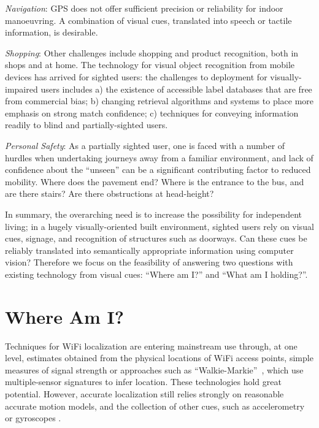 \emph{Navigation}: GPS does not offer sufficient precision or reliability for indoor manoeuvring. A combination of visual cues, translated into speech or tactile information, is desirable.

\emph{Shopping}: Other challenges include shopping and product recognition, both in shops and at home. The technology for visual object recognition from mobile devices has arrived for sighted users: the challenges to deployment for visually-impaired users includes a) the existence of accessible label databases that are free from commercial bias; b) changing retrieval algorithms and systems to place more emphasis on strong match confidence; c) techniques for conveying information readily to blind and partially-sighted users.

\emph{Personal Safety}: As a partially sighted user, one is faced with a number of hurdles when undertaking journeys away from a familiar environment, and lack of confidence about the ``unseen'' can be a significant contributing factor to reduced mobility.  Where does the pavement end?  Where is the entrance to the bus, and are there stairs?  Are there obstructions at head-height?   

In summary, the overarching need is to increase the possibility for independent living; in a hugely visually-oriented built environment, sighted users rely on visual cues, signage, and recognition of structures such as doorways.  Can these cues be reliably translated into semantically appropriate information using computer vision? Therefore we focus on the feasibility of answering two questions with existing technology from visual cues: ``Where am I?'' and ``What am I holding?''. 


\section{Where Am I?}

Techniques for WiFi localization are entering mainstream use through, at one level, estimates obtained from the physical locations of WiFi access points, simple measures of signal strength or approaches such as ``Walkie-Markie''~\cite{Shen}, which use multiple-sensor signatures to infer location.  These technologies hold great potential.  However, accurate localization still relies strongly on reasonable accurate motion models, and the collection of other cues, such as accelerometry or gyroscopes \cite{Wang2012}.  

